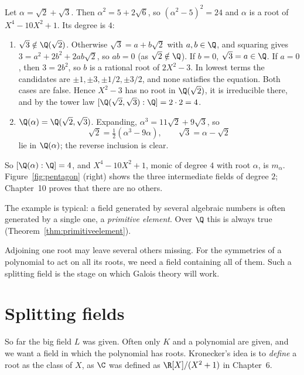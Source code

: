\begin{example}\label{ex:sqrt2sqrt3}
Let $\alpha=\sqrt2+\sqrt3$. Then $\alpha^2=5+2\sqrt6$, so $(\alpha^2-5)^2=24$ and $\alpha$ is a root of $X^4-10X^2+1$. Its degree is $4$:
\begin{enumerate}[label=(\arabic*)]
\item $\sqrt3\notin\Q(\sqrt2)$. Otherwise $\sqrt3=a+b\sqrt2$ with $a,b\in\Q$, and squaring gives $3=a^2+2b^2+2ab\sqrt2$, so $ab=0$ (as $\sqrt2\notin\Q$). If $b=0$, $\sqrt3=a\in\Q$. If $a=0$, then $3=2b^2$, so $b$ is a rational root of $2X^2-3$. In lowest terms the candidates are $\pm1,\pm3,\pm1/2,\pm3/2$, and none satisfies the equation. Both cases are false. Hence $X^2-3$ has no root in $\Q(\sqrt2)$, it is irreducible there, and by the tower law $[\Q(\sqrt2,\sqrt3):\Q]=2\cdot2=4$.
\item $\Q(\alpha)=\Q(\sqrt2,\sqrt3)$. Expanding, $\alpha^3=11\sqrt2+9\sqrt3$, so
\[
\sqrt2=\tfrac12(\alpha^3-9\alpha),\qquad\sqrt3=\alpha-\sqrt2
\]
lie in $\Q(\alpha)$; the reverse inclusion is clear.
\end{enumerate}
So $[\Q(\alpha):\Q]=4$, and $X^4-10X^2+1$, monic of degree $4$ with root $\alpha$, is $m_\alpha$. Figure~\ref{fig:pentagon} (right) shows the three intermediate fields of degree $2$; Chapter~10 proves that there are no others.
\end{example}

The example is typical: a field generated by several algebraic numbers is often generated by a single one, a \emph{primitive element}. Over $\Q$ this is always true (Theorem~\ref{thm:primitiveelement}).

Adjoining one root may leave several others missing. For the symmetries of a polynomial to act on all its roots, we need a field containing all of them. Such a splitting field is the stage on which Galois theory will work.

\section{Splitting fields}\label{sec:splitting}

So far the big field $L$ was given. Often only $K$ and a polynomial are given, and we want a field in which the polynomial has roots. Kronecker's idea is to \emph{define} a root as the class of $X$, as $\C$ was defined as $\R[X]/(X^2+1)$ in Chapter~6.

